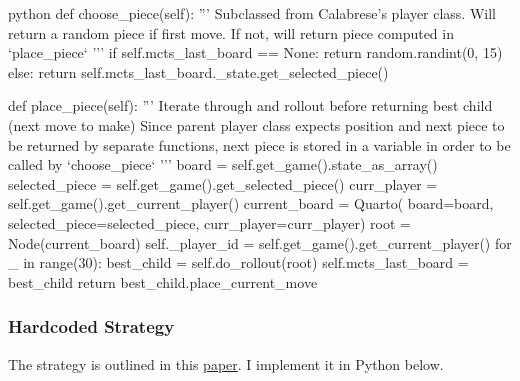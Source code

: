 \begin{mintedbox}{python}
    def choose_piece(self):
        '''
        Subclassed from Calabrese's player class. Will return a random piece if first move. If not, will return piece computed in `place_piece`
        '''
        if self.mcts_last_board == None:
            return random.randint(0, 15)
        else:
            return self.mcts_last_board._state.get_selected_piece()

    def place_piece(self):
        '''
        Iterate through and rollout before returning best child (next move to make)
        Since parent player class expects position and next piece to be
        returned by separate functions, next piece is stored in a variable in order to be called by `choose_piece`
        '''
        board = self.get_game().state_as_array()
        selected_piece = self.get_game().get_selected_piece()
        curr_player = self.get_game().get_current_player()
        current_board = Quarto(
            board=board, selected_piece=selected_piece, curr_player=curr_player)
        root = Node(current_board)
        self._player_id = self.get_game().get_current_player()
        for _ in range(30):
            best_child = self.do_rollout(root)
        self.mcts_last_board = best_child
        return best_child.place_current_move

\end{mintedbox}

\subsubsection{Hardcoded Strategy}

The strategy is outlined in this \href{https://scholarworks.umt.edu/cgi/viewcontent.cgi?article=1334&context=tme}{paper}. I implement it in Python below.

